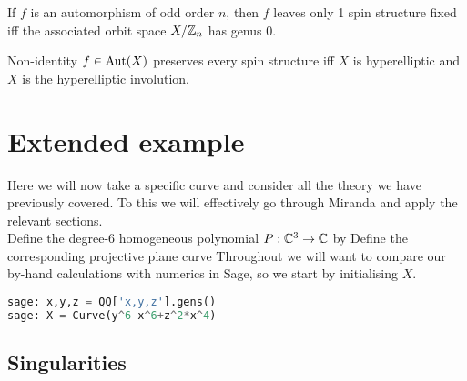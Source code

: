 \documentclass{article}
\begin{document}
\begin{prop}
	If $f$ is an automorphism of odd order $n$, then $f$ leaves only 1 spin structure fixed iff the associated orbit space $X/\mathbb{Z}_n$ has genus 0. 
\end{prop}

\begin{theorem}
	Non-identity $f \in \operatorname{Aut}(X)$ preserves every spin structure iff $X$ is hyperelliptic and $X$ is the hyperelliptic involution. 
\end{theorem}

\section{Extended example}
Here we will now take a specific curve and consider all the theory we have previously covered. To this we will effectively go through Miranda \cite{Miranda1995} and apply the relevant sections. \\
Define the degree-$6$ homogeneous polynomial $P:\mathbb{C}^3 \to \mathbb{C}$ by 
Define the corresponding projective plane curve 
Throughout we will want to compare our by-hand calculations with numerics in Sage, so we start by initialising $X$. 
\begin{lstlisting}[language=Python,frame=single]
sage: x,y,z = QQ['x,y,z'].gens()
sage: X = Curve(y^6-x^6+z^2*x^4)
\end{lstlisting}

\subsection{Singularities}
\end{document}
